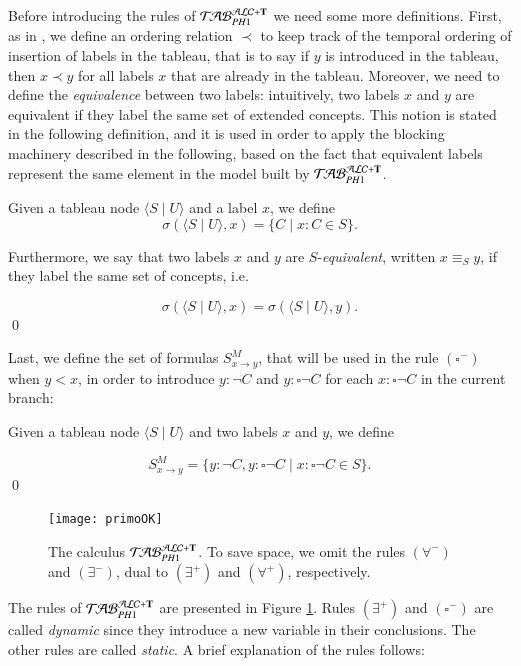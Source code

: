 \documentclass[a4paper, 11pt, oneside]{elsarticle}
\newcommand{\tip}{{\bf T}}
\newcommand{\nott} {\lnot}
\newcommand{\tc} {\mid}
\newcommand{\imp} {\rightarrow}
\newcommand{\bbox}{\square}
\newcommand{\sx} {\langle}
\newcommand{\dx} {\rangle}
\newcommand{\perogni} {\forall}
\newcommand{\esiste} {\exists}
\newcommand{\Gammam}[2]{S^{M}_{#1 \imp #2}}
\newcommand{\primo}{\mathrel{{\mathcal{T}\!\mathcal{AB}}}_{PH 1}^{\mathcal{ALC}+\mbox{\scriptsize $\tip$}}}
\newenvironment{definition}
{\begin{defi} \rm}{\qed \end{defi}}
\newcounter{posu}
\newtheorem{definition}[posu]{Definition}
\begin{document}
Before introducing the rules of $\primo$ we need some more definitions. First, as in \cite{buchheit-et-al}, we define an ordering relation $\prec$ to keep track of the temporal ordering of insertion of labels in the tableau, that is to say if $y$ is introduced in the tableau, then $x \prec y$ for all labels $x$ that are already in the tableau. Moreover, we need to define the \emph{equivalence} between two labels: intuitively, two labels $x$ and $y$ are equivalent if they label the same set of extended concepts. This notion is stated in the following definition, and it is used in order to apply the blocking machinery described in the following, based on the fact that equivalent labels represent the same element in the model built by $\primo$.

\begin{definition}
Given a tableau node $\sx S \tc U \dx$ and a label $x$, we define
$$\sigma(\sx S \tc U \dx,x)=\{C \tc x: C \in S\}.$$


\noindent Furthermore, we say that two labels $x$ and $y$ are $S$-\emph{equivalent}, written  $x \equiv_S y$, if they label the same set of concepts, i.e.

$$\sigma(\sx S \tc U \dx,x)=\sigma(\sx S \tc U \dx,y).$$
\end{definition}

\noindent Last, we define the set of formulas $\Gammam{x}{y}$, that will be used in the rule
$(\bbox^-)$ when $y<x$, in order to introduce $y: \nott C$ and $y: \bbox \nott C$ for each $x: \bbox \nott C$ in the current branch:

\begin{definition}
Given a tableau node $\sx S \tc U \dx$ and two labels $x$ and $y$,
we define

$$\Gammam{x}{y}=\{y: \nott C, y: \bbox \nott C \tc x: \bbox \nott C \in S\}.$$
\end{definition}


\begin{figure}[t]
{\centerline{
\texttt{[image: primoOK]}} }  \caption{The calculus $\primo$. To save space, we omit the rules $(\perogni^-)$ and $(\esiste^-)$, dual to $(\esiste^+)$ and $(\perogni^+)$, respectively.}\label{immagine calcolo}
\end{figure}


\noindent The rules of $\primo$ are presented in Figure \ref{immagine calcolo}.
Rules $(\esiste^{+})$ and $(\bbox^{-})$ are called \emph{dynamic} since they introduce a new variable in their conclusions. The other rules are called \emph{static}. \color{black} A brief explanation of the rules follows:
\end{document}
